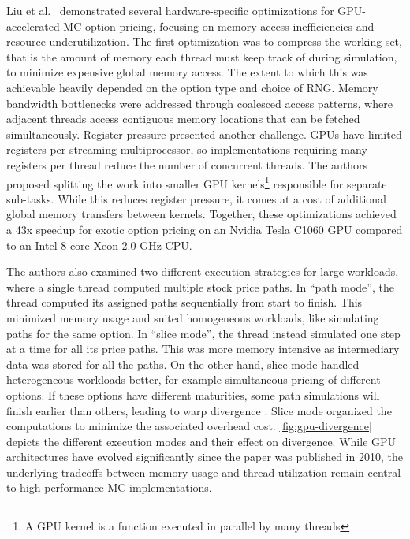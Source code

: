 \documentclass[english,12pt,a4paper,pdftex,sci,utf8]{aaltothesis}
\begin{document}
Liu et al.\ \cite{liu2010efficient} demonstrated several hardware-specific optimizations for GPU-accelerated MC option pricing, focusing on memory access inefficiencies and resource underutilization. The first optimization was to compress the working set, that is the amount of memory each thread must keep track of during simulation, to minimize expensive global memory access. The extent to which this was achievable heavily depended on the option type and choice of RNG. Memory bandwidth bottlenecks were addressed through coalesced access patterns, where adjacent threads access contiguous memory locations that can be fetched simultaneously. Register pressure presented another challenge. GPUs have limited registers per streaming multiprocessor, so implementations requiring many registers per thread reduce the number of concurrent threads. The authors proposed splitting the work into smaller GPU kernels\footnote{A GPU kernel is a function executed in parallel by many threads} responsible for separate sub-tasks. While this reduces register pressure, it comes at a cost of additional global memory transfers between kernels. Together, these optimizations achieved a 43x speedup for exotic option pricing on an Nvidia Tesla C1060 GPU compared to an Intel 8-core Xeon 2.0 GHz CPU.

The authors also examined two different execution strategies for large workloads, where a single thread computed multiple stock price paths. In ``path mode'', the thread computed its assigned paths sequentially from start to finish. This minimized memory usage and suited homogeneous workloads, like simulating paths for the same option. In ``slice mode'', the thread instead simulated one step at a time for all its price paths. This was more memory intensive as intermediary data was stored for all the paths. On the other hand, slice mode handled heterogeneous workloads better, for example simultaneous pricing of different options. If these options have different maturities, some path simulations will finish earlier than others, leading to warp divergence \cite{liu2010efficient}. Slice mode organized the computations to minimize the associated overhead cost. \cref{fig:gpu-divergence} depicts the different execution modes and their effect on divergence. While GPU architectures have evolved significantly since the paper was published in 2010, the underlying tradeoffs between memory usage and thread utilization remain central to high-performance MC implementations.
\end{document}
